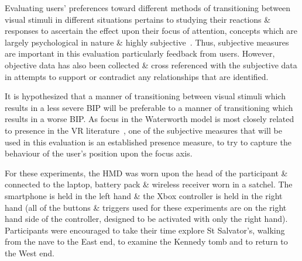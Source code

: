 \documentclass[conference]{acmsiggraph}
\begin{document}
Evaluating users' preferences toward different methods of transitioning between visual stimuli in different situations pertains to studying their reactions \& responses to ascertain the effect upon their focus of attention, concepts which are largely psychological in nature \& highly subjective~\cite{Ijsselsteijn2001}. Thus, subjective measures are important in this evaluation particularly feedback from users. However, objective data has also been collected \& cross referenced with the subjective data in attempts to support or contradict any relationships that are identified.

It is hypothesized that a manner of transitioning between visual stimuli which results in a less severe BIP will be preferable to a manner of transitioning which results in a worse BIP. As focus in the Waterworth model is most closely related to presence in the VR literature~\cite{Waterworth2001}, one of the subjective measures that will be used in this evaluation is an established presence measure, to try to capture the behaviour of the user's position upon the focus axis.

For these experiments, the HMD was worn upon the head of the participant \& connected to the laptop, battery pack \& wireless receiver worn in a satchel. The smartphone is held in the left hand \& the Xbox controller is held in the right hand (all of the buttons \& triggers used for these experiments are on the right hand side of the controller, designed to be activated with only the right hand). Participants were encouraged to take their time explore St Salvator's, walking from the nave to the East end, to examine the Kennedy tomb and to return to the West end.
\end{document}
